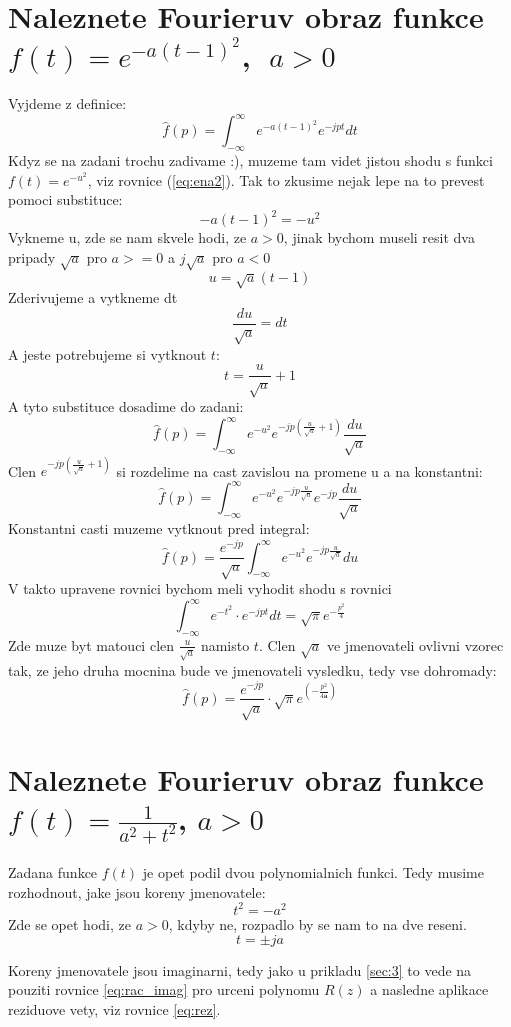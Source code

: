 \newpage

\section{\label{sec:4}Naleznete Fourieruv obraz funkce $f(t)=e^{-a(t-1)^2}$,$\;$ $a>0$}
Vyjdeme z definice:
$$\hat{f}(p)=\int_{-\infty}^\infty e^{-a(t-1)^2} e^{-jpt}dt$$
Kdyz se na zadani trochu zadivame :), muzeme tam videt jistou shodu s funkci $f(t)=e^{-u^2}$, viz rovnice (\ref{eq:ena2}). Tak to zkusime nejak lepe na to prevest pomoci substituce:
$$-a(t-1)^2 = -u^2$$
Vykneme u, zde se nam skvele hodi, ze $a>0$, jinak bychom museli resit dva pripady $\sqrt{a}$ pro $a>=0$ a $j\sqrt{a}$ pro $a<0$
$$u = \sqrt{a}(t-1)$$
Zderivujeme a vytkneme dt
$$\frac{du}{\sqrt{a}}=dt$$
A jeste potrebujeme si vytknout $t$:
$$t= \frac{u}{\sqrt{a}}+1$$
A tyto substituce dosadime do zadani:
$$\hat{f}(p)=\int_{-\infty}^\infty e^{-u^2}e^{-jp\left( \frac{u}{\sqrt{a}}+1\right)}\frac{du}{\sqrt{a}}$$
Clen $e^{-jp\left(\frac{u}{\sqrt{a}}+1\right)}$ si rozdelime na cast zavislou na promene u a na konstantni:
$$\hat{f}(p)=\int_{-\infty}^\infty e^{-u^2}e^{-jp\frac{u}{\sqrt{a}}}e^{-jp}\frac{du}{\sqrt{a}}$$
Konstantni casti muzeme vytknout pred integral:
$$\hat{f}(p)=\frac{e^{-jp}}{\sqrt{a}}\int_{-\infty}^\infty e^{-u^2}e^{-jp\frac{u}{\sqrt{a}}}du$$
V takto upravene rovnici bychom meli vyhodit shodu s rovnici
$$\int_{-\infty}^\infty e^{{-t}^2}\cdot e^{-jpt}dt = \sqrt{\pi}e^{-\frac{p^2}{4}}$$
Zde muze byt matouci clen $\frac{u}{\sqrt{a}}$ namisto $t$. Clen $\sqrt{a}$ ve jmenovateli ovlivni vzorec tak, ze jeho druha mocnina bude ve jmenovateli vysledku, tedy vse dohromady:
$$\hat{f}(p)=\frac{e^{-jp}}{\sqrt{a}}\cdot \sqrt{\pi}e^{\left(-\frac{\displaystyle p^2}{\displaystyle 4\boldsymbol{a}}\right)}$$

\newpage

\section{Naleznete Fourieruv obraz funkce $f(t)=\frac{1}{a^2+t^2}$, $a>0$}

Zadana funkce $f(t)$ je opet podil dvou polynomialnich funkci. Tedy musime rozhodnout, jake jsou koreny jmenovatele:
$$t^2=-a^2$$
Zde se opet hodi, ze $a>0$, kdyby ne, rozpadlo by se nam to na dve reseni.
$$t = \pm ja$$

Koreny jmenovatele jsou imaginarni, tedy jako u prikladu \ref{sec:3} to vede na pouziti rovnice \ref{eq:rac_imag} pro urceni polynomu $R(z)$ a nasledne aplikace reziduove vety, viz rovnice \ref{eq:rez}.

